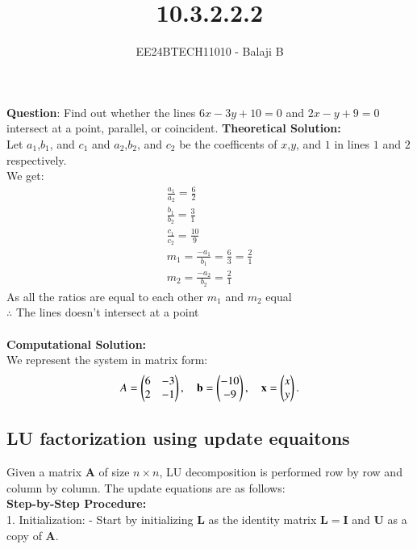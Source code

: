\documentclass[journal]{IEEEtran}
\begin{document}

\vspace{3cm}

\title{10.3.2.2.2}
\author{EE24BTECH11010 - Balaji B}
{\let\newpage\relax\maketitle}

\renewcommand{\thefigure}{\theenumi}
\renewcommand{\thetable}{\theenumi}
\setlength{\intextsep}{10pt} %


\renewcommand{\thetable}{\theenumi}


\textbf{Question}:\newline
Find out whether the lines $6x-3y+10=0$ and $2x-y+9=0$ intersect at a point, parallel, or coincident. 
\newline
\textbf{Theoretical Solution:}\\
Let $a_1$,$b_1$, and $c_1$ and $a_2$,$b_2$, and $c_2$ be the coefficents of $x$,$y$, and $1$ in lines $1$ and $2$ respectively.\\
We get:
\begin{align}
    \frac{a_1}{a_2}=\frac{6}{2}\\
    \frac{b_1}{b_2}=\frac{3}{1}\\
    \frac{c_1}{c_2}=\frac{10}{9}\\
    m_1=\frac{-a_1}{b_1}=\frac{6}{3} = \frac{2}{1}\\
    m_2=\frac{-a_2}{b_2}=\frac{2}{1}
\end{align}
As all the ratios are equal to each other $m_1$ and $m_2$ equal\\
$\therefore$ The lines doesn't intersect at a point\\\\
\textbf{Computational Solution:}\\
We represent the system in matrix form:
\begin{align}
A = \begin{pmatrix}6& -3 \\ 2 & -1\end{pmatrix}, \quad
\mathbf{b} = \begin{pmatrix}-10 \\ -9\end{pmatrix}, \quad
\mathbf{x} = \begin{pmatrix}x \\ y\end{pmatrix}.
\end{align}

\subsection*{LU factorization using update equaitons}
    Given a matrix $ \mathbf{A} $ of size $ n \times n $, LU decomposition is performed row by row and column by column. The update equations are as follows:\\
    \textbf{Step-by-Step Procedure:}\\
1. Initialization: 
   - Start by initializing $ \mathbf{L} $ as the identity matrix $ \mathbf{L} = \mathbf{I} $ and $ \mathbf{U} $ as a copy of $ \mathbf{A} $.
   
\end{document}
